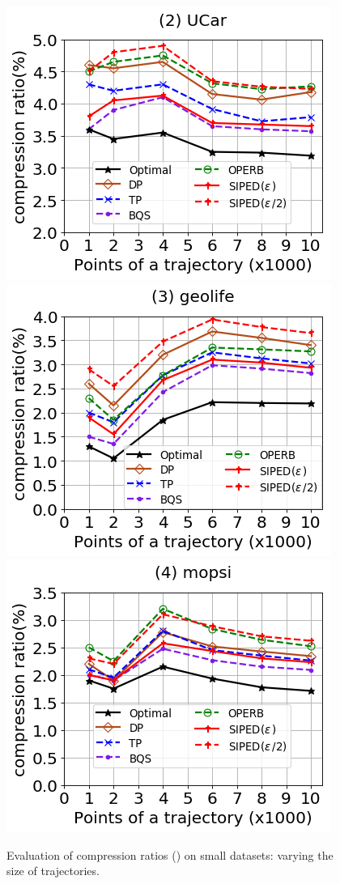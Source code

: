 \begin{figure}[tb!]
	\centering
	\includegraphics[scale=0.320]{Figures/Exp-PED-CR-size-service.png} 	\hspace{3ex}
	\includegraphics[scale=0.320]{Figures/Exp-PED-CR-size-geolife.png}	\hspace{3ex}
	\includegraphics[scale=0.320]{Figures/Exp-PED-CR-size-mopsi.png}		
	\vspace{-2ex}
	\caption{\small Evaluation of compression ratios (\ped) on small datasets: varying the size of
		trajectories.}
	\label{fig:cr-ped-size}
	\vspace{-2ex}
\end{figure}

